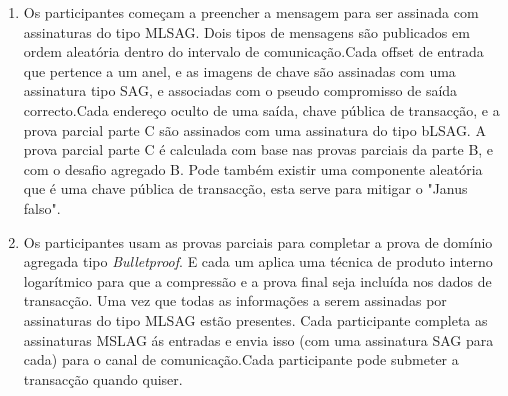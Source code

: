 \begin{enumerate}
    \item Os participantes começam a preencher a mensagem para ser assinada com assinaturas do tipo MLSAG. Dois tipos de mensagens são publicados em ordem aleatória dentro do intervalo de comunicação.\newline Cada offset de entrada que pertence a um anel, e as imagens de chave são assinadas com uma assinatura tipo SAG, e associadas com o pseudo compromisso de saída correcto.\newline Cada endereço oculto de uma saída, chave pública de transacção, e a prova parcial parte C são assinados com uma assinatura do tipo bLSAG. A prova parcial parte C é calculada com base nas provas parciais da parte B, e com o desafio agregado B. Pode também existir uma componente aleatória que é uma chave pública de transacção, esta serve para mitigar o "Janus falso".        

    \item Os participantes usam as provas parciais para completar a prova de domínio agregada tipo {\em Bulletproof}. E cada um aplica uma técnica de produto interno logarítmico para que a compressão e a prova final seja incluída nos dados de transacção. Uma vez que todas as informações a serem assinadas por assinaturas do tipo MLSAG estão presentes. Cada participante completa as assinaturas MSLAG ás entradas e envia isso (com uma assinatura SAG para cada) para o canal de comunicação.\newline Cada participante pode submeter a transacção quando quiser.

\end{enumerate}{}

